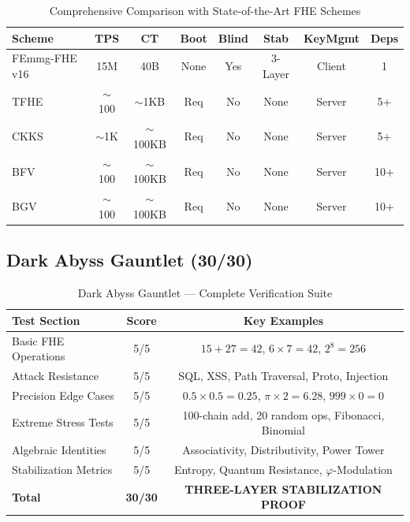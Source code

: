 \documentclass{article}
\begin{document}
\begin{table}[H]
\centering
\begin{tabular}{|l|c|c|c|c|c|c|c|}
\hline
\textbf{Scheme} & \textbf{TPS} & \textbf{CT} & \textbf{Boot} & \textbf{Blind} & \textbf{Stab} & \textbf{KeyMgmt} & \textbf{Deps} \\
\hline
FEmmg-FHE v16 & 15M & 40B & None & Yes & 3-Layer & Client & 1 \\
TFHE & $\sim$100 & $\sim$1KB & Req & No & None & Server & 5+ \\
CKKS & $\sim$1K & $\sim$100KB & Req & No & None & Server & 5+ \\
BFV & $\sim$100 & $\sim$100KB & Req & No & None & Server & 10+ \\
BGV & $\sim$100 & $\sim$100KB & Req & No & None & Server & 10+ \\
\hline
\end{tabular}
\caption{Comprehensive Comparison with State-of-the-Art FHE Schemes}
\end{table}

\subsection{Dark Abyss Gauntlet (30/30)}

\begin{table}[H]
\centering
\begin{tabular}{|l|c|c|}
\hline
\textbf{Test Section} & \textbf{Score} & \textbf{Key Examples} \\
\hline
Basic FHE Operations & 5/5 & $15+27=42$, $6\times7=42$, $2^8=256$ \\
Attack Resistance & 5/5 & SQL, XSS, Path Traversal, Proto, Injection \\
Precision Edge Cases & 5/5 & $0.5\times0.5=0.25$, $\pi\times2=6.28$, $999\times0=0$ \\
Extreme Stress Tests & 5/5 & 100-chain add, 20 random ops, Fibonacci, Binomial \\
Algebraic Identities & 5/5 & Associativity, Distributivity, Power Tower \\
Stabilization Metrics & 5/5 & Entropy, Quantum Resistance, $\varphi$-Modulation \\
\hline
\textbf{Total} & \textbf{30/30} & \textbf{THREE-LAYER STABILIZATION PROOF} \\
\hline
\end{tabular}
\caption{Dark Abyss Gauntlet — Complete Verification Suite}
\end{table}
\end{document}
